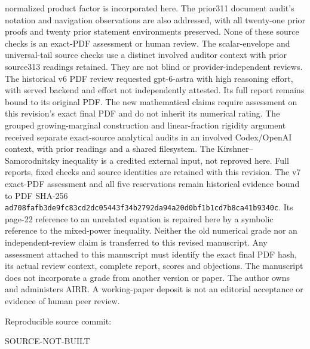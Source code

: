 \documentclass[11pt]{article}
\providecommand{\SourceCommit}{SOURCE-NOT-BUILT}
\begin{document}
normalized product factor is incorporated here. The prior311 document
audit's notation and navigation observations are also addressed, with all
twenty-one prior proofs and twenty prior statement environments preserved.
None of these source checks is an exact-PDF assessment or human review.
The scalar-envelope and universal-tail source checks use a distinct
involved auditor context with prior source313 readings retained. They are
not blind or provider-independent reviews. The historical v6 PDF review
requested gpt-6-astra with high reasoning effort, with served backend and
effort not independently attested. Its full report remains bound to its
original PDF. The new mathematical claims require assessment on this
revision's exact final PDF and do not inherit its numerical rating.
The grouped growing-marginal construction and linear-fraction rigidity
argument received separate exact-source analytical audits in an involved
Codex/OpenAI context, with prior readings and a shared filesystem. The
Kirshner--Samorodnitsky inequality is a credited external input, not reproved
here. Full reports, fixed checks and source identities are retained with this
revision. The v7 exact-PDF assessment and all five reservations remain
historical evidence bound to PDF SHA-256
\texttt{ad708fafb3de9fc83cd2dc05443f34b2}\allowbreak\texttt{792da94a20d0bf1b1cd7b8ca41b9340c}.
Its page-22 reference to an unrelated equation is repaired here by a symbolic
reference to the mixed-power inequality. Neither the old numerical grade nor
an independent-review claim is transferred to this revised manuscript.
Any assessment attached to this manuscript must identify the exact final
PDF hash, its actual review context, complete report, scores and objections.
The manuscript does not incorporate a grade from another version or paper.
The author owns and administers AIRR. A working-paper deposit is not an
editorial acceptance or evidence of human peer review.

\smallskip\noindent
Reproducible source commit:\par\noindent
{\small\ttfamily\SourceCommit}
\end{document}

